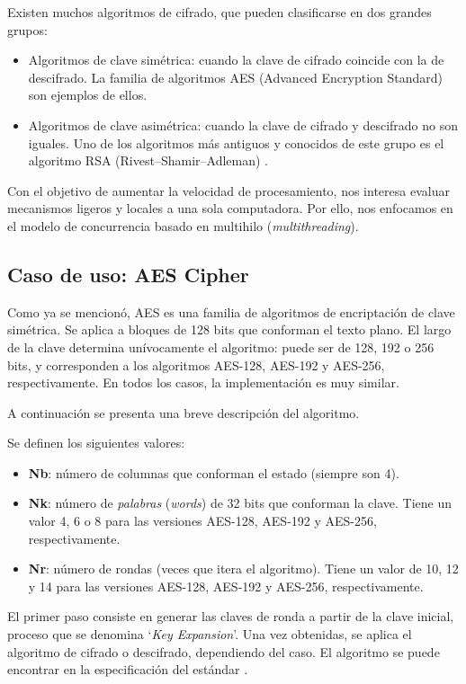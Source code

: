 \documentclass[11pt]{article}
\let\Oldsubsection\subsection
\renewcommand{\subsection}{\FloatBarrier\Oldsubsection}
\newcommand{\english}[1]{\textit{#1}}
\newcommand{\technical}[1]{\textit{#1}}
\begin{document}
Existen muchos algoritmos de cifrado, que pueden clasificarse en dos grandes grupos:

\begin{itemize}
    \item Algoritmos de clave simétrica: cuando la clave de cifrado coincide con la de descifrado. La familia de algoritmos AES (Advanced Encryption Standard) \cite{aes:aes} son ejemplos de ellos.
    \item Algoritmos de clave asimétrica: cuando la clave de cifrado y descifrado no son iguales. Uno de los algoritmos más antiguos y conocidos de este grupo es el algoritmo RSA (Rivest–Shamir–Adleman) \cite{aes:rsa}.
\end{itemize}

Con el objetivo de aumentar la velocidad de procesamiento, nos interesa evaluar mecanismos ligeros y locales a una sola computadora. Por ello, nos enfocamos en el modelo de concurrencia basado en multihilo (\english{multithreading}).

\subsection{Caso de uso: AES Cipher}

Como ya se mencionó, AES es una familia de algoritmos de encriptación de clave simétrica. Se aplica a bloques de 128 bits que conforman el texto plano. El largo de la clave determina unívocamente el algoritmo: puede ser de 128, 192 o 256 bits, y corresponden a los algoritmos AES-128, AES-192 y AES-256, respectivamente. En todos los casos, la implementación es muy similar.

A continuación se presenta una breve descripción del algoritmo.

Se definen los siguientes valores:

\begin{itemize}
    \item \textbf{Nb}: número de columnas que conforman el estado (siempre son 4).
    \item \textbf{Nk}: número de \technical{palabras} (\english{words}) de 32 bits que conforman la clave. Tiene un valor 4, 6 o 8 para las versiones AES-128, AES-192 y AES-256, respectivamente.
    \item \textbf{Nr}: número de rondas (veces que itera el algoritmo). Tiene un valor de 10, 12 y 14 para las versiones AES-128, AES-192 y AES-256, respectivamente.
\end{itemize}

El primer paso consiste en generar las claves de ronda a partir de la clave inicial, proceso que se denomina `\english{Key Expansion}'. Una vez obtenidas, se aplica el algoritmo de cifrado o descifrado, dependiendo del caso. El algoritmo se puede encontrar en la especificación del estándar \cite{aes:aes}.
\end{document}

